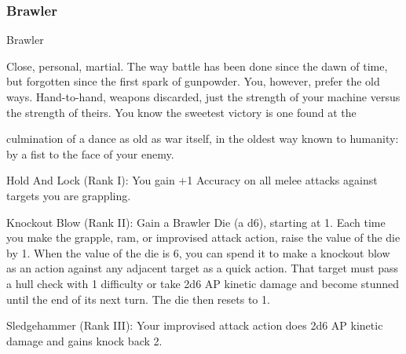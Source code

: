 \subsubsection{Brawler}

                                                     Brawler

Close, personal, martial. The way battle has been done since the dawn of time, but forgotten since the first
spark of gunpowder. You, however, prefer the old ways. Hand-to-hand, weapons discarded, just the
strength of your machine versus the strength of theirs. You know the sweetest victory is one found at the

culmination of a dance as old as war itself, in the oldest way known to humanity: by a fist to the face of
your enemy.

Hold And Lock (Rank I): You gain +1 Accuracy on all melee attacks against targets you are
grappling.

Knockout Blow (Rank II): Gain a Brawler Die (a d6), starting at 1. Each time you make the
grapple, ram, or improvised attack action, raise the value of the die by 1. When the value of the
die is 6, you can spend it to make a knockout blow as an action against any adjacent target as a
quick action. That target must pass a hull check with 1 difficulty or take 2d6 AP kinetic damage
and become stunned until the end of its next turn. The die then resets to 1.

Sledgehammer (Rank III): Your improvised attack action does 2d6 AP kinetic damage and gains
knock back 2.
